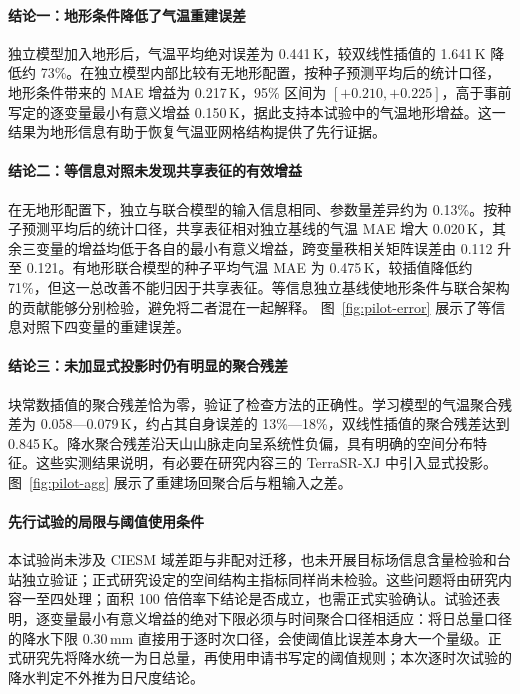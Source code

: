 \paragraph{结论一：地形条件降低了气温重建误差}
独立模型加入地形后，气温平均绝对误差为 0.441\,K，较双线性插值的 1.641\,K 降低约 73\%。在独立模型内部比较有无地形配置，按种子预测平均后的统计口径，地形条件带来的 MAE 增益为 0.217\,K，95\% 区间为 $[+0.210,+0.225]$，高于事前写定的逐变量最小有意义增益 0.150\,K，据此支持本试验中的气温地形增益。这一结果为地形信息有助于恢复气温亚网格结构提供了先行证据。

\paragraph{结论二：等信息对照未发现共享表征的有效增益}
在无地形配置下，独立与联合模型的输入信息相同、参数量差异约为 0.13\%。按种子预测平均后的统计口径，共享表征相对独立基线的气温 MAE 增大 0.020\,K，其余三变量的增益均低于各自的最小有意义增益，跨变量秩相关矩阵误差由 0.112 升至 0.121。有地形联合模型的种子平均气温 MAE 为 0.475\,K，较插值降低约 71\%，但这一总改善不能归因于共享表征。等信息独立基线使地形条件与联合架构的贡献能够分别检验，避免将二者混在一起解释。
图~\ref{fig:pilot-error} 展示了等信息对照下四变量的重建误差。

\paragraph{结论三：未加显式投影时仍有明显的聚合残差}
块常数插值的聚合残差恰为零，验证了检查方法的正确性。学习模型的气温聚合残差为 0.058—0.079\,K，约占其自身误差的 13\%—18\%，双线性插值的聚合残差达到 0.845\,K。降水聚合残差沿天山山脉走向呈系统性负偏，具有明确的空间分布特征。这些实测结果说明，有必要在研究内容三的 TerraSR-XJ 中引入显式投影。
图~\ref{fig:pilot-agg} 展示了重建场回聚合后与粗输入之差。

\paragraph{先行试验的局限与阈值使用条件}
本试验尚未涉及 CIESM 域差距与非配对迁移，也未开展目标场信息含量检验和台站独立验证；正式研究设定的空间结构主指标同样尚未检验。这些问题将由研究内容一至四处理；面积 100 倍倍率下结论是否成立，也需正式实验确认。试验还表明，逐变量最小有意义增益的绝对下限必须与时间聚合口径相适应：将日总量口径的降水下限 0.30\,mm 直接用于逐时次口径，会使阈值比误差本身大一个量级。正式研究先将降水统一为日总量，再使用申请书写定的阈值规则；本次逐时次试验的降水判定不外推为日尺度结论。

